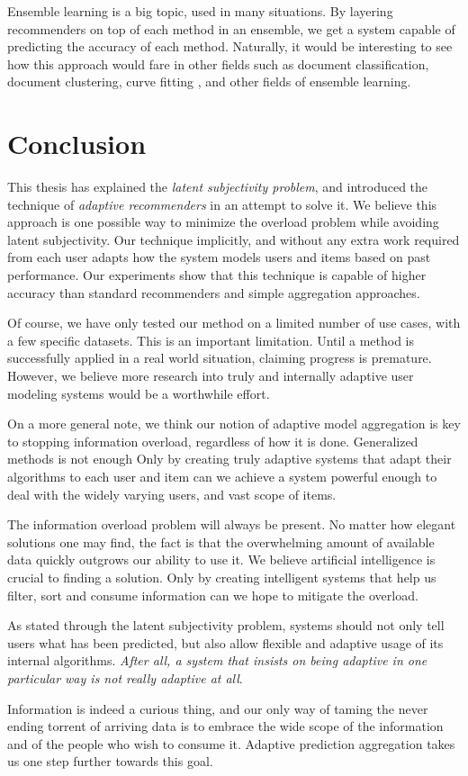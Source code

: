 Ensemble learning is a big topic, used in many situations.
By layering recommenders on top of each method in an ensemble, 
we get a system capable of predicting the accuracy of each method.
Naturally, it would be interesting to see how this approach would fare
in other fields such as document classification, document clustering,
curve fitting \cite[p7]{Polikar2006}, and other fields of ensemble learning.


\clearpage
\section{Conclusion}

This thesis has explained the \emph{latent subjectivity problem},
and introduced the technique of \emph{adaptive recommenders}
in an attempt to solve it.
We believe this approach is one possible way to minimize the overload problem
while avoiding latent subjectivity.
Our technique implicitly, and without any extra work required from each user
adapts how the system models users and items based on past performance.
Our experiments show that this technique is capable of higher accuracy
than standard recommenders and simple aggregation approaches.

Of course, we have only tested our method on a limited 
number of use cases, with a few specific datasets.
This is an important limitation.
Until a method is successfully applied in a real world
situation, claiming progress is premature.
However, we believe more research into 
truly and internally adaptive user modeling systems
would be a worthwhile effort.

On a more general note, we think our notion of adaptive model
aggregation is key to stopping information overload,
regardless of how it is done.
Generalized methods is not enough
Only by creating truly adaptive systems that adapt their
algorithms to each user and item can we achieve a 
system powerful enough to deal with the widely
varying users, and vast scope of items.

The information overload problem will always be present.
No matter how elegant solutions one may find,
the fact is that the overwhelming amount of available data
quickly outgrows our ability to use it.
We believe artificial intelligence is crucial to finding a solution.
Only by creating intelligent systems that 
help us filter, sort and consume information can we hope 
to mitigate the overload.

As stated through the latent subjectivity problem,
systems should not only tell users what has been predicted,
but also allow flexible and adaptive usage of its internal algorithms.
\emph{After all, a system that insists on being adaptive
in one particular way is not really adaptive at all}.

\hr

\noindent
Information is indeed a curious thing,
and our only way of taming the never ending torrent of 
arriving data is to embrace the wide scope of the information
and of the people who wish to consume it.
Adaptive prediction aggregation takes us one step further towards this goal.

